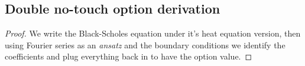 \begin{appendices}

\section{Double no-touch option derivation}
\label{appendix:a}

\begin{proof}
We write the Black-Scholes equation under it's heat equation version, then using Fourier series as an \textit{ansatz} and the boundary conditions we identify the coefficients and plug everything back in to have the option value.
\end{proof}


\end{appendices}
